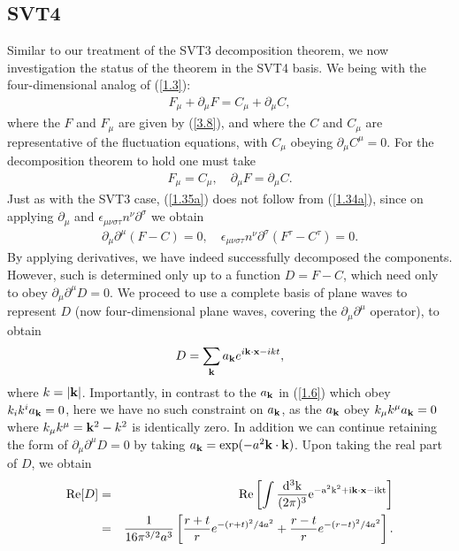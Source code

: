 \subsection{SVT4}
\label{ss:decomp_svt4_basis}

Similar to our treatment of the SVT3 decomposition theorem, we now investigation the status of the theorem in the SVT4 basis. We being with the four-dimensional analog of (\ref{1.3}): 
%
\begin{eqnarray}
F_{\mu}+\partial_{\mu}F=C_{\mu}+\partial_{\mu}C,
\label{1.34a}
\end{eqnarray}
%
where the $F$ and $F_{\mu}$ are given by (\ref{3.8}), and where the $C$ and $C_{\mu}$ are representative of the fluctuation equations, with $C_{\mu}$ obeying  $\partial_{\mu}C^{\mu}=0$. For the decomposition theorem to hold one must take
%
\begin{eqnarray}
F_{\mu}= C_{\mu},\quad \partial_{\mu}F=\partial_{\mu}C.
\label{1.35a}
\end{eqnarray}
%
Just as with the SVT3 case, (\ref{1.35a}) does not follow from (\ref{1.34a}), since on applying $\partial_{\mu}$  and $\epsilon_{\mu\nu\sigma\tau}n^{\nu}\partial^{\sigma}$ we obtain
%
\begin{eqnarray}
\partial_{\mu}\partial^{\mu}(F-C)=0,\quad \epsilon_{\mu\nu\sigma\tau}n^{\nu}\partial^{\sigma}(F^{\tau}-C^{\tau})=0.
\label{1.36a}
\end{eqnarray}
%
By applying derivatives, we have indeed successfully decomposed the components. However, such is determined only up to a function  $D=F-C$, which need only to obey $\partial_\mu\partial^\mu D = 0$. We proceed to use a complete basis of plane waves to represent $D$ (now four-dimensional plane waves, covering the $\partial_{\mu}\partial^{\mu}$ operator), to obtain
%
\begin{eqnarray}
D=\sum _{\bf k}a_{\bf k}e^{i\textbf{k}\cdot \textbf{x}-ikt},
\label{1.37a}
\end{eqnarray}
%
where $k=|{\bf k}|$. Importantly, in contrast to the $a_{\bf k}$ in (\ref{1.6}) which obey $k_ik^ia_{\bf k}=0$, here we have no such constraint on $a_{\bf k}$, as the $a_{\bf k}$ obey $k_{\mu}k^{\mu}a_{\bf k}=0$ where $k_{\mu}k^{\mu}={\bf k}^2-k^2$ is identically zero. In addition we can continue retaining the form of $\partial_{\mu}\partial^{\mu}D=0$ by taking $a_{\bf k}=\exp(-a^2{\bf k}\cdot{\bf k})$. Upon taking the real part of $D$, we obtain
%
\begin{eqnarray}
{\rm Re}[D]&=&\rm Re\left[\int \frac{d^3k}{(2\pi)^3}e^{-a^2k^2+i\textbf{k}\cdot \textbf{x}-ikt}\right]
\nonumber\\
&=&
\frac{1}{16\pi^{3/2}a^3}\left[\frac{r+t}{r}e^{-(r+t)^2/4a^2}+\frac{r-t}{r}e^{-(r-t)^2/4a^2}\right].
\label{1.38a}
\end{eqnarray}
